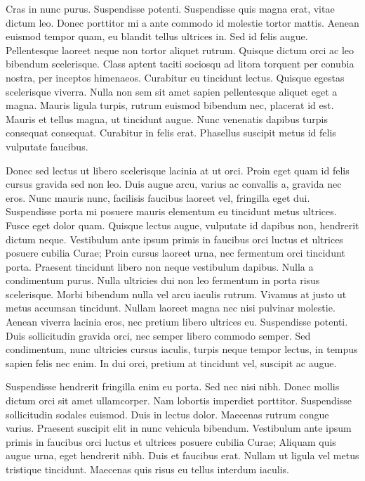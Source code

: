 Cras in nunc purus.
Suspendisse potenti.
Suspendisse quis magna erat, vitae dictum leo.
Donec porttitor mi a ante commodo id molestie tortor mattis.
Aenean euismod tempor quam, eu blandit tellus ultrices in.
Sed id felis augue.
Pellentesque laoreet neque non tortor aliquet rutrum.
Quisque dictum orci ac leo bibendum scelerisque.
Class aptent taciti sociosqu ad litora torquent per conubia nostra, per inceptos himenaeos.
Curabitur eu tincidunt lectus.
Quisque egestas scelerisque viverra.
Nulla non sem sit amet sapien pellentesque aliquet eget a magna.
Mauris ligula turpis, rutrum euismod bibendum nec, placerat id est.
Mauris et tellus magna, ut tincidunt augue.
Nunc venenatis dapibus turpis consequat consequat.
Curabitur in felis erat.
Phasellus suscipit metus id felis vulputate faucibus.

Donec sed lectus ut libero scelerisque lacinia at ut orci.
Proin eget quam id felis cursus gravida sed non leo.
Duis augue arcu, varius ac convallis a, gravida nec eros.
Nunc mauris nunc, facilisis faucibus laoreet vel, fringilla eget dui.
Suspendisse porta mi posuere mauris elementum eu tincidunt metus ultrices.
Fusce eget dolor quam.
Quisque lectus augue, vulputate id dapibus non, hendrerit dictum neque.
Vestibulum ante ipsum primis in faucibus orci luctus et ultrices posuere cubilia Curae; Proin cursus laoreet urna, nec fermentum orci tincidunt porta.
Praesent tincidunt libero non neque vestibulum dapibus.
Nulla a condimentum purus.
Nulla ultricies dui non leo fermentum in porta risus scelerisque.
Morbi bibendum nulla vel arcu iaculis rutrum.
Vivamus at justo ut metus accumsan tincidunt.
Nullam laoreet magna nec nisi pulvinar molestie.
Aenean viverra lacinia eros, nec pretium libero ultrices eu.
Suspendisse potenti.
Duis sollicitudin gravida orci, nec semper libero commodo semper.
Sed condimentum, nunc ultricies cursus iaculis, turpis neque tempor lectus, in tempus sapien felis nec enim.
In dui orci, pretium at tincidunt vel, suscipit ac augue.

Suspendisse hendrerit fringilla enim eu porta.
Sed nec nisi nibh.
Donec mollis dictum orci sit amet ullamcorper.
Nam lobortis imperdiet porttitor.
Suspendisse sollicitudin sodales euismod.
Duis in lectus dolor.
Maecenas rutrum congue varius.
Praesent suscipit elit in nunc vehicula bibendum.
Vestibulum ante ipsum primis in faucibus orci luctus et ultrices posuere cubilia Curae; Aliquam quis augue urna, eget hendrerit nibh.
Duis et faucibus erat.
Nullam ut ligula vel metus tristique tincidunt.
Maecenas quis risus eu tellus interdum iaculis.

